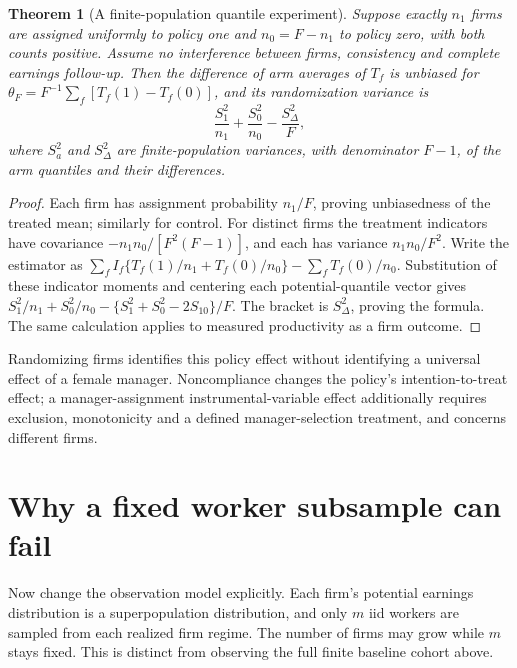 \documentclass[11pt]{article}
\newtheorem{theorem}{Theorem}
\theoremstyle{remark}
\begin{document}
\begin{theorem}[A finite-population quantile experiment]
Suppose exactly $n_1$ firms are assigned uniformly to policy one and $n_0=F-n_1$ to policy zero, with both counts positive. Assume no interference between firms, consistency and complete earnings follow-up. Then the difference of arm averages of $T_f$ is unbiased for
$\theta_F=F^{-1}\sum_f[T_f(1)-T_f(0)]$, and its randomization variance is
\[
 \frac{S_1^2}{n_1}+\frac{S_0^2}{n_0}-\frac{S_\Delta^2}{F},
\]
where $S_a^2$ and $S_\Delta^2$ are finite-population variances, with denominator $F-1$, of the arm quantiles and their differences.
\end{theorem}
\begin{proof}
Each firm has assignment probability $n_1/F$, proving unbiasedness of the treated mean; similarly for control. For distinct firms the treatment indicators have covariance $-n_1n_0/[F^2(F-1)]$, and each has variance $n_1n_0/F^2$. Write the estimator as
$\sum_f I_f\{T_f(1)/n_1+T_f(0)/n_0\}-\sum_fT_f(0)/n_0$.
Substitution of these indicator moments and centering each potential-quantile vector gives
$S_1^2/n_1+S_0^2/n_0-\{S_1^2+S_0^2-2S_{10}\}/F$.
The bracket is $S_\Delta^2$, proving the formula. The same calculation applies to measured productivity as a firm outcome.
\end{proof}
Randomizing firms identifies this policy effect without identifying a universal effect of a female manager. Noncompliance changes the policy's intention-to-treat effect; a manager-assignment instrumental-variable effect additionally requires exclusion, monotonicity and a defined manager-selection treatment, and concerns different firms.

\section*{Why a fixed worker subsample can fail}
Now change the observation model explicitly. Each firm's potential earnings distribution is a superpopulation distribution, and only $m$ iid workers are sampled from each realized firm regime. The number of firms may grow while $m$ stays fixed. This is distinct from observing the full finite baseline cohort above.
\end{document}
